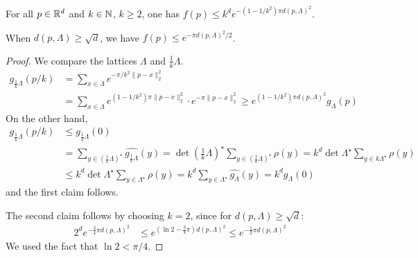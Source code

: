 \begin{lemma}
  \label{lemma:f-small-close-to-lattice}
  For all $p \in \mathbb{R}^d$ and $k \in \mathbb{N}$, $k \geq 2$,
  one has $f(p) \leq k^d e^{-(1-1/k^2) \pi d(p,\Lambda)^2}$.

  When $d(p,\Lambda) \geq \sqrt{d}$, we have $f(p) \leq e^{-\pi d(p,\Lambda)^2 / 2}$.
\end{lemma}
\begin{proof}
  We compare the lattices $\Lambda$ and $\frac{1}{k} \Lambda$.
  \begin{align*}
    g_{\frac{1}{k}\Lambda}(p/k) &= \sum_{x\in\Lambda} e^{-\pi/k^2 \|p - x\|_2^2} \\
      &= \sum_{x \in\Lambda} e^{(1-1/k^2) \pi \|p - x\|_2^2} \cdot e^{-\pi \|p - x\|_2^2}
      \geq e^{(1-1/k^2) \pi d(p,\Lambda)^2} g_\Lambda(p)
  \end{align*}
  On the other hand,
  \begin{align*}
    g_{\frac{1}{k}\Lambda}(p/k)
      &\leq g_{\frac{1}{k}\Lambda}(0) \\
      &= \sum_{y \in (\frac{1}{k}\Lambda)^\star} \widehat{g_{\frac{1}{k}\Lambda}}(y)
      = \det (\frac{1}{k}\Lambda)^\star \sum_{y \in (\frac{1}{k}\Lambda)^\star} \rho(y)
      = k^d \det\Lambda^\star \sum_{y \in k\Lambda^\star} \rho(y) \\
      &\leq k^d \det\Lambda^\star \sum_{y \in \Lambda^\star} \rho(y)
      = k^d \sum_{y\in\Lambda^\star} \widehat{g_\Lambda}(y) = k^d g_\Lambda(0)
  \end{align*}
  and the first claim follows.

  The second claim follows by choosing $k = 2$,
  since for $d(p,\Lambda) \geq \sqrt{d}$:
  \begin{align*}
    2^d e^{-\frac{3}{4} \pi d(p,\Lambda)^2}
      &\leq e^{(\ln 2 - \frac{3}{4}\pi) d(p,\Lambda)^2} \leq e^{-\frac{1}{2} \pi d(p, \Lambda)^2}
  \end{align*}
  We used the fact that $\ln 2 < \pi/4$.
\end{proof}

